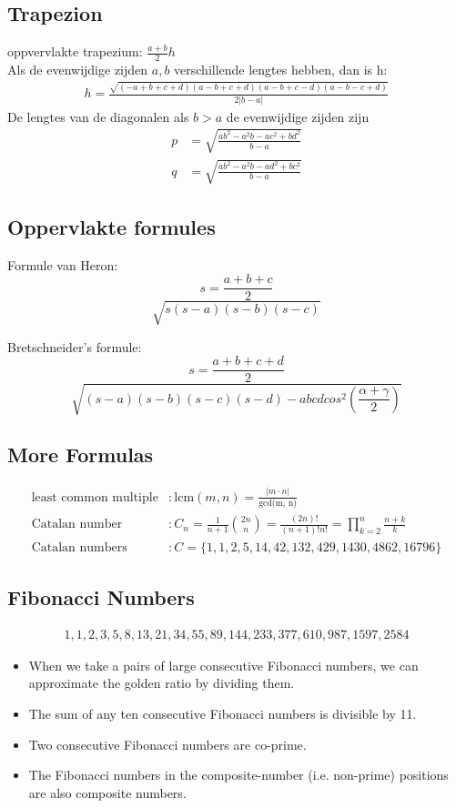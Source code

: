 \documentclass[a4paper, twocolumn]{article}
\begin{document}
\subsection{Trapezion}
oppvervlakte trapezium: $\frac{a+b}{2}h$\\
Als de evenwijdige zijden $a,b$ verschillende lengtes hebben, dan is h:
\begin{align*}
h = \frac{\sqrt{(-a+b+c+d)(a-b+c+d)(a-b+c-d)(a-b-c+d)}}{2|b-a|}
\end{align*}
De lengtes van de diagonalen als $b>a$ de evenwijdige zijden zijn
\begin{align*}
p &= \sqrt{\frac{ab^2-a^2b-ac^2+bd^2}{b-a}}\\
q &= \sqrt{\frac{ab^2-a^2b-ad^2+bc^2}{b-a}}
\end{align*}

\subsection{Oppervlakte formules}
Formule van Heron:\\
$$s = \frac{a+b+c}{2}$$
$$\sqrt{s(s-a)(s-b)(s-c)}$$

Bretschneider's formule:\\
$$s = \frac{a+b+c+d}{2}$$
$$\sqrt{(s-a)(s-b)(s-c)(s-d)-abcd cos^2\left(\frac{\alpha+\gamma}{2}\right)}$$

\subsection*{More Formulas}
\begin{align*}
\text{least common multiple} &: \text{lcm}(m, n) = \frac{|m \cdot
	n|}{\text{gcd(m, n)}} \\
\text{Catalan number} &: C_n = \frac{1}{n+1}{2n \choose n} =
\frac{(2n)!}{(n+1)!n!} = \prod^n_{k=2}\frac{n+k}{k} \\
\text{Catalan numbers} &: C = \{1, 1, 2, 5, 14, 42, 132, 429, 1430, 4862,
16796\}
\end{align*}
\vspace{-1em}
\newpage
\subsection*{Fibonacci Numbers}\vspace*{-1em}
\begin{align*}
1,1,2,3,5,8,13,21,34,55,89, 144, 233, 377, 610, 987, 1597, 2584
\end{align*}
\begin{itemize}
	\item  When we take a pairs of large consecutive Fibonacci numbers, we can
	approximate the golden ratio by dividing them.
	\item The sum of any ten consecutive Fibonacci numbers is divisible by 11.
	\item Two consecutive Fibonacci numbers are co-prime.
	\item The Fibonacci numbers in the composite-number (i.e. non-prime)
	positions are also composite numbers.
\end{itemize}
\end{document}
